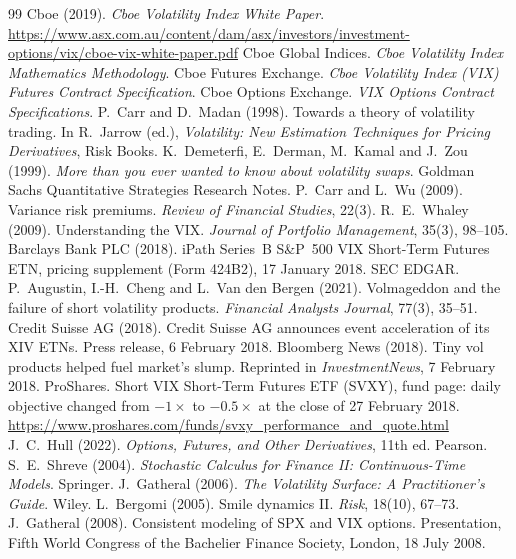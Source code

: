 \documentclass[11pt,a4paper]{article}
\begin{document}
\begin{thebibliography}{99}
 Cboe (2019). \emph{Cboe Volatility Index White Paper}. \url{https://www.asx.com.au/content/dam/asx/investors/investment-options/vix/cboe-vix-white-paper.pdf}
 Cboe Global Indices. \emph{Cboe Volatility Index Mathematics Methodology}.
 Cboe Futures Exchange. \emph{Cboe Volatility Index (VIX) Futures Contract Specification}.
 Cboe Options Exchange. \emph{VIX Options Contract Specifications}.
 P.~Carr and D.~Madan (1998). Towards a theory of volatility trading. In R.~Jarrow (ed.), \emph{Volatility: New Estimation Techniques for Pricing Derivatives}, Risk Books.
 K.~Demeterfi, E.~Derman, M.~Kamal and J.~Zou (1999). \emph{More than you ever wanted to know about volatility swaps}. Goldman Sachs Quantitative Strategies Research Notes.
 P.~Carr and L.~Wu (2009). Variance risk premiums. \emph{Review of Financial Studies}, 22(3).
 R.~E.~Whaley (2009). Understanding the VIX. \emph{Journal of Portfolio Management}, 35(3), 98--105.
 Barclays Bank PLC (2018). iPath Series~B S\&P~500 VIX Short-Term Futures ETN, pricing supplement (Form 424B2), 17 January 2018. SEC EDGAR.
 P.~Augustin, I.-H.~Cheng and L.~Van den Bergen (2021). Volmageddon and the failure of short volatility products. \emph{Financial Analysts Journal}, 77(3), 35--51.
 Credit Suisse AG (2018). Credit Suisse AG announces event acceleration of its XIV ETNs. Press release, 6 February 2018.
 Bloomberg News (2018). Tiny vol products helped fuel market's slump. Reprinted in \emph{InvestmentNews}, 7 February 2018.
 ProShares. Short VIX Short-Term Futures ETF (SVXY), fund page: daily objective changed from $-1\times$ to $-0.5\times$ at the close of 27 February 2018. \url{https://www.proshares.com/funds/svxy_performance_and_quote.html}
 J.~C.~Hull (2022). \emph{Options, Futures, and Other Derivatives}, 11th ed. Pearson.
 S.~E.~Shreve (2004). \emph{Stochastic Calculus for Finance II: Continuous-Time Models}. Springer.
 J.~Gatheral (2006). \emph{The Volatility Surface: A Practitioner's Guide}. Wiley.
 L.~Bergomi (2005). Smile dynamics II. \emph{Risk}, 18(10), 67--73.
 J.~Gatheral (2008). Consistent modeling of SPX and VIX options. Presentation, Fifth World Congress of the Bachelier Finance Society, London, 18 July 2008.
\end{thebibliography}
\end{document}

